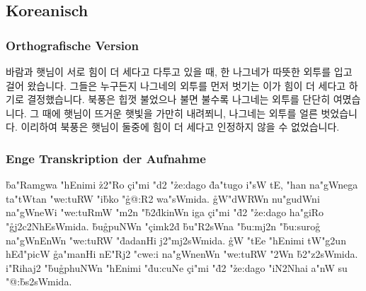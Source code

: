 \documentclass[a4paper,11pt]{article}		%
\begin{document}
\begin{CJK}{UTF8}{mj}
\begin{IPA}
\subsection{Koreanisch}

\subsubsection{Orthografische Version}
바람과 햇님이 서로 힘이 더 세다고 다투고 있을 때, 한 나그네가 따뜻한 외투를 입고 걸어 왔습니다. 그들은 누구든지 나그네의 외투를 먼저 벗기는 이가 힘이 더 세다고 하기로 결정했습니다. 북풍은 힙껏 불었으나 불면 불수록 나그네는 외투를 단단히 여몄습니다. 그 때에 햇님이 뜨거운 햇빛을 가만히 내려쬐니, 나그네는 외투를 얼른 벗었습니다. 이리하여 북풍은 햇님이 둘중에 힘이 더 세다고 인정하지 않을 수 없었습니다.

\subsubsection{Enge Transkription der Aufnahme}

\r*ba"Ramgwa "hEn\textltailn imi \r*z2"Ro \c{c}i"mi "d2 "\r*ze:dago \r*da"tugo i"sW\textrtaill{} tE, "han na"gWnega ta"tWtan "we:tuRW\textrtaill{} "i\r*bko "\r{g}@:R2 wa"sWm\textltailn ida. \r{g}W"dWRWn nu"gudWn\textbardotlessj i na"gWneWi "we:tuRmW\textrtaill{} "m2n "\r*b2\r*dkinWn \textltailn iga \c{c}i"mi "\r*d2 "\r*ze:dago ha"giRo "\r{g}j2\textrtaill c2NhEsWm\textltailn ida. \r*bu\r{g}puNWn "\c{c}imk2\r*d \r*bu"R2sWna "\r*bu:\textrtaill mj2n "\r*bu:\textrtaill suro\r{g} na"gWnEnWn "we:tuRW\textrtaill{} "\r*dadanHi j2"mj2sWm\textltailn ida. \r{g}W "tEe "hEn\textltailn imi tW"g2un hE\r*d"picW\textrtaill{} \r{g}a"manHi nE"Rj2 "cwe:\textltailn i na"gWnenWn "we:tuRW\textrtaill{} "2\textrtaill \textrtaill Wn \r*b2"z2sWm\textltailn ida. i"Rihaj2 "\r*bu\r{g}phuNWn "hEn\textltailn imi "\r*du:\textrtaill cuNe \c{c}i"mi "\r*d2 "\r*ze:dago "iN\textbardotlessj 2Nha\textbardotlessj i a"nW\textrtaill{} su "@:\r*bs2sWm\textltailn ida.
\end{IPA}
\end{CJK}
\end{document}
